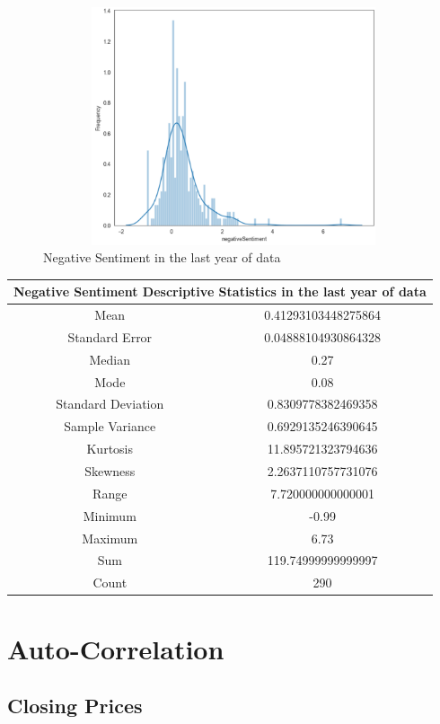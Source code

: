 \begin{figure}[h!]
    \centering
    \includegraphics[width=15cm,height=7cm,keepaspectratio]{resultsEvaluation/negativeDesc1.png}
    \caption{Negative Sentiment in the last year of data}
    \label{fig:appendix_negativeDesc1}
\end{figure}
\begin{center}
\begin{tabular}{ c c }
\hline
\multicolumn{2}{|c|}{Negative Sentiment Descriptive Statistics in the last year of data} \\
\hline
Mean & 0.41293103448275864 \\
Standard Error & 0.04888104930864328 \\
Median & 0.27 \\
Mode & 0.08 \\
Standard Deviation & 0.8309778382469358 \\
Sample Variance & 0.6929135246390645 \\
Kurtosis & 11.895721323794636 \\
Skewness & 2.2637110757731076 \\
Range & 7.720000000000001 \\
Minimum & -0.99 \\
Maximum & 6.73 \\
Sum & 119.74999999999997 \\
Count & 290
\end{tabular}
\end{center}

\section{Auto-Correlation}

\subsection{Closing Prices}

